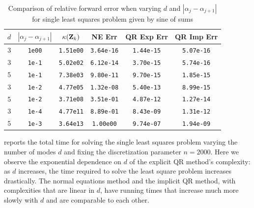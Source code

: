 \documentclass{article}
\newcommand{\M}[2][]{\bm{#1{\mathbf{\MakeUppercase{#2}}}}} 		%
\begin{document}
\begin{table}[ht!] 
  \centering
  \begin{tabular}{|c|c|c|c|c|c|}
    \hline
    $d$  & $|\alpha_j-\alpha_{j+1}|$ & $\kappa(\M{Z}_k)$ & NE Err & QR Exp Err & QR Imp Err \\
    \hline
    3  & \texttt{1e00}  & \texttt{1.51e00}  & \texttt{3.64e-16} & \texttt{1.44e-15} & \texttt{5.07e-16} \\
    3  & \texttt{1e-1} & \texttt{5.02e02}  & \texttt{6.12e-14} & \texttt{3.70e-15} & \texttt{5.74e-16} \\
    5  & \texttt{1e-1} & \texttt{7.38e03}  & \texttt{9.80e-11} & \texttt{9.70e-15} & \texttt{1.85e-15}\\
    3  & \texttt{1e-2} & \texttt{4.77e05}  & \texttt{1.32e-08} & \texttt{5.40e-13} & \texttt{8.99e-15} \\
    5  & \texttt{1e-2} & \texttt{3.71e08}  & \texttt{3.51e-01} & \texttt{4.87e-12} & \texttt{1.27e-14}\\
    3  & \texttt{1e-4} & \texttt{4.77e11} & \texttt{8.89e-01} & \texttt{8.43e-09} & \texttt{1.31e-12} \\
    5  & \texttt{1e-3} & \texttt{3.64e13} & \texttt{1.00e00}  & \texttt{9.74e-07} & \texttt{1.94e-09}\\
    \hline
  \end{tabular}
  \caption{Comparison of relative forward error when varying $d$ and $|\alpha_j-\alpha_{j+1}|$ for single least squares problem given by sine of sums}
  \label{tab:LS_err}
\end{table}

 reports the total time for solving the single least squares problem varying the number of modes $d$ and fixing the discretization parameter $n=2000$.
Here we observe the exponential dependence on $d$ of the explicit QR method's complexity: as $d$ increases, the time required to solve the least square problem increases drastically.
The normal equations method and the implicit QR method, with complexities that are linear in $d$, have running times that increase much more slowly with $d$ and are comparable to each other.
\end{document}
